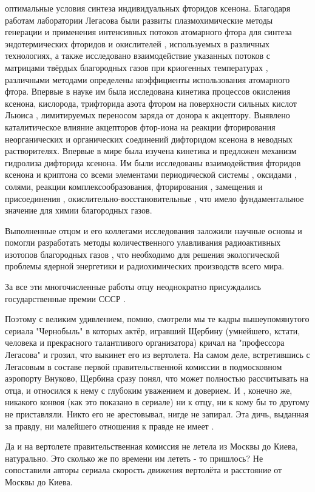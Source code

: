 оптимальные условия синтеза индивидуальных фторидов ксенона. Благодаря работам
лаборатории Легасова были развиты плазмохимические методы генерации и
применения интенсивных потоков атомарного фтора для синтеза эндотермических
фторидов и окислителей , используемых в различных технологиях, а также
исследовано взаимодействие указанных потоков с матрицами твёрдых благородных
газов при криогенных температурах , различными методами определены коэффициенты
использования атомарного фтора. Впервые в науке им была исследована кинетика
процессов окисления ксенона, кислорода, трифторида азота фтором на поверхности
сильных кислот Льюиса , лимитируемых переносом заряда от донора к акцептору.
Выявлено каталитическое влияние акцепторов фтор-иона на реакции фторирования
неорганических и органических соединений дифторидом ксенона в неводных
растворителях. Впервые в мире была изучена кинетика и предложен механизм
гидролиза дифторида ксенона. Им были исследованы взаимодействия фторидов
ксенона и криптона со всеми элементами периодической системы , оксидами ,
солями, реакции комплексообразования, фторирования , замещения и присоединения
, окислительно-восстановительные , что имело фундаментальное значение для химии
благородных газов. 

Выполненные отцом и его коллегами исследования заложили научные основы и
помогли разработать методы количественного улавливания радиоактивных изотопов
благородных газов , что необходимо для решения экологической проблемы ядерной
энергетики и радиохимических производств всего мира. 

За все эти многочисленные работы отцу неоднократно присуждались государственные премии СССР . 

Поэтому с великим удивлением, помню, смотрели мы те кадры вышеупомянутого
сериала "Чернобыль" в которых актёр, игравший Щербину (умнейшего, кстати,
человека и прекрасного талантливого организатора) кричал на "профессора
Легасова" и грозил, что выкинет его из вертолета. На самом деле, встретившись с
Легасовым  в составе первой правительственной комиссии в подмосковном аэропорту
Внуково, Щербина сразу понял, что может полностью рассчитывать на отца, и
относился к нему с глубоким уважением и доверием. И , конечно же, никакого
конвоя (как это показано в сериале) ни к отцу, ни к кому бы то другому не
приставляли. Никто его не арестовывал, нигде не запирал. Эта дичь, выданная за
правду, ни малейшего отношения к правде не имеет . 

Да и на вертолете правительственная комиссия не летела из Москвы до Киева,
натурально. Это сколько же по времени им лететь - то пришлось? Не сопоставили
авторы сериала скорость движения вертолёта и расстояние от Москвы до Киева. 

